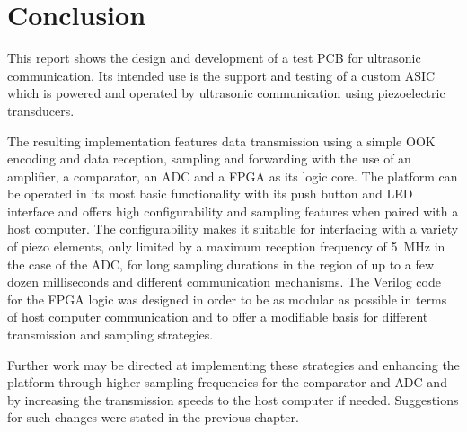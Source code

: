 \documentclass[
	english,
	ruledheaders=section, %
	class=report,%
	thesis={type=Project Seminar Report},%
	accentcolor=TUDa-1d, %
	custommargins=false,%
	marginpar=false,%
	parskip=half-,%
	fontsize=11pt,%
]{tudapub}
\begin{document}
\chapter{Conclusion}
This report shows the design and development of a test \gls{PCB} for ultrasonic communication. Its intended use is the support and testing of a custom ASIC which is powered and operated by ultrasonic communication using piezoelectric transducers.

The resulting implementation features data transmission using a simple \gls{OOK} encoding and data reception, sampling and forwarding with the use of an amplifier, a comparator, an \gls{ADC} and a \gls{FPGA} as its logic core. The platform can be operated in its most basic functionality with its push button and \gls{LED} interface and offers high configurability and sampling features when paired with a host computer. The configurability makes it suitable for interfacing with a variety of piezo elements, only limited by a maximum reception frequency of \SI{5}{\mega\hertz} in the case of the \gls{ADC}, for long sampling durations in the region of up to a few dozen milliseconds and different communication mechanisms. The Verilog code for the \gls{FPGA} logic was designed in order to be as modular as possible in terms of host computer communication and to offer a modifiable basis for different transmission and sampling strategies.

Further work may be directed at implementing these strategies and enhancing the platform through higher sampling frequencies for the comparator and \gls{ADC} and by increasing the transmission speeds to the host computer if needed. Suggestions for such changes were stated in the previous chapter.




\setcounter{biburllcpenalty}{7000}
\setcounter{biburlucpenalty}{8000}
\printbibliography

\listoffigures

\lstlistoflistings
\end{document}
